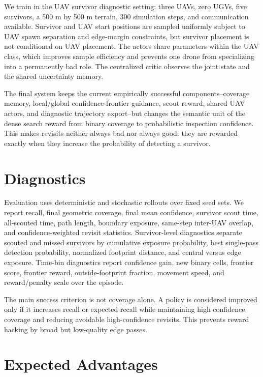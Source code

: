 \documentclass{article}
\begin{document}
We train in the UAV survivor diagnostic setting: three UAVs, zero UGVs, five
survivors, a 500 m by 500 m terrain, 300 simulation steps, and communication
available. Survivor and UAV start positions are sampled uniformly subject to UAV
spawn separation and edge-margin constraints, but survivor placement is not
conditioned on UAV placement. The actors share parameters within the UAV class,
which improves sample efficiency and prevents one drone from specializing into a
permanently bad role. The centralized critic observes the joint state and the
shared uncertainty memory.

The final system keeps the current empirically successful components--coverage
memory, local/global confidence-frontier guidance, scout reward, shared UAV
actors, and diagnostic trajectory export--but changes the semantic unit of the
dense search reward from binary coverage to probabilistic inspection confidence.
This makes revisits neither always bad nor always good: they are rewarded
exactly when they increase the probability of detecting a survivor.

\section{Diagnostics}

Evaluation uses deterministic and stochastic rollouts over fixed seed sets. We
report recall, final geometric coverage, final mean confidence, survivor scout
time, all-scouted time, path length, boundary exposure, same-step inter-UAV
overlap, and confidence-weighted revisit statistics. Survivor-level diagnostics
separate scouted and missed survivors by cumulative exposure probability, best
single-pass detection probability, normalized footprint distance, and central
versus edge exposure. Time-bin diagnostics report confidence gain, new binary
cells, frontier score, frontier reward, outside-footprint fraction, movement
speed, and reward/penalty scale over the episode.

The main success criterion is not coverage alone. A policy is considered
improved only if it increases recall or expected recall while maintaining high
confidence coverage and reducing avoidable high-confidence revisits. This
prevents reward hacking by broad but low-quality edge passes.

\section{Expected Advantages}
\end{document}
